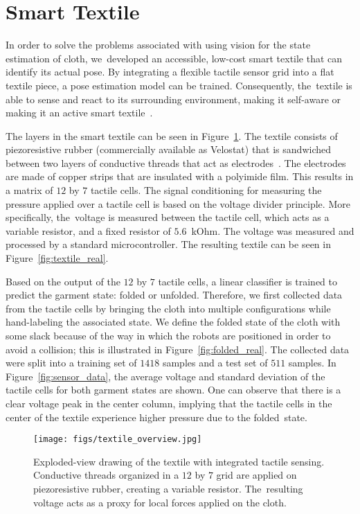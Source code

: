 \documentclass[applsci,article,accept,moreauthors,pdftex]{Definitions/mdpi}
\begin{document}
\section{Smart Textile}
\label{sec:textile}

In order to solve the problems associated with using vision for the state estimation of cloth, we~developed an accessible, low-cost smart textile that can identify its actual pose. By integrating a flexible tactile sensor grid into a flat textile piece, a pose estimation model can be trained. Consequently, the~textile is able to sense and react to its surrounding environment, making it self-aware or making it an active smart textile~\cite{Stoppa2014}.

The layers in the smart textile can be seen in Figure~\ref{fig:textile_scheme}. The textile consists of piezoresistive rubber (commercially available as Velostat\textsuperscript{\textregistered}) that is sandwiched between two layers of conductive threads that act as electrodes~\cite{Drimus2014}. The electrodes are made of copper strips that are insulated with a polyimide film. This results in a matrix of $12$ by $7$ tactile cells. The signal conditioning for measuring the pressure applied over a tactile cell is based on the voltage divider principle. More specifically, the~voltage is measured between the tactile cell, which acts as a variable resistor, and a fixed resistor of $5.6$~kOhm. The voltage was measured and processed by a standard microcontroller. The resulting textile can be seen in Figure~\ref{fig:textile_real}.

Based on the output of the $12$ by $7$ tactile cells, a linear classifier is trained to predict the garment state: folded or unfolded. Therefore, we first collected data from the tactile cells by bringing the cloth into multiple configurations while hand-labeling the associated state. We define the folded state of the cloth with some slack because of the way in which the robots are positioned in order to avoid a collision; this is illustrated in Figure~\ref{fig:folded_real}. The collected data were split into a training set of $1418$ samples and a test set of $511$ samples. In Figure~\ref{fig:sensor_data}, the average voltage and standard deviation of the tactile cells for both garment states are shown. One can observe that there is a clear voltage peak in the center column, implying that the tactile cells in the center of the textile experience higher pressure due to the folded~state.
\begin{figure}[H]
\centering
\texttt{[image: figs/textile\_overview.jpg]}
\caption{Exploded-view drawing of the textile with integrated tactile sensing. Conductive threads organized in a $12$ by $7$ grid are applied on piezoresistive rubber, creating a variable resistor. The~resulting voltage acts as a proxy for local forces applied on the cloth. } %
\label{fig:textile_scheme}
\end{figure}
\unskip
\end{document}
